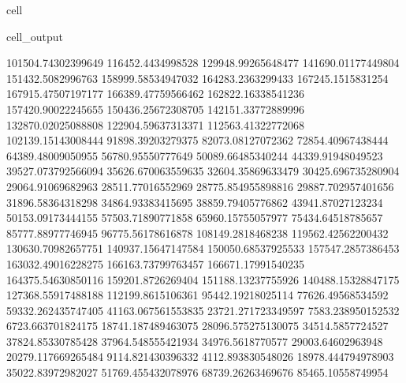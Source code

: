 \documentclass[letterpaper,10pt,english]{jupyterBook}
\begin{document}
\begin{sphinxuseclass}{cell}
\begin{sphinxVerbatimOutput}
\begin{sphinxuseclass}{cell_output}
\begin{sphinxVerbatim}[commandchars=\\\{\}]
101504.74302399649  116452.4434998528  129948.99265648477  141690.01177449804  151432.5082996763  158999.58534947032  164283.2363299433  167245.1515831254  167915.47507197177  166389.47759566462  162822.16338541236  157420.90022245655  150436.25672308705  142151.33772889996  132870.02025088808  122904.59637313371  112563.41322772068  102139.15143008444  91898.39203279375  82073.08127072362  72854.40967438444  64389.48009050955  56780.95550777649  50089.66485340244  44339.91948049523  39527.073792566094  35626.670063559635  32604.35869633479  30425.696735280904  29064.91069682963  28511.77016552969  28775.854955898816  29887.702957401656  31896.58364318298  34864.93383415695  38859.79405776862  43941.87027123234  50153.09173444155  57503.71890771858  65960.15755057977  75434.64518785657  85777.88977746945  96775.56178616878  108149.2818468238  119562.42562200432  130630.70982657751  140937.15647147584  150050.68537925533  157547.2857386453  163032.49016228275  166163.73799763457  166671.17991540235  164375.54630850116  159201.8726269404  151188.13237755926  140488.15328847175  127368.55917488188  112199.8615106361  95442.19218025114  77626.49568534592  59332.262435747405  41163.067561553835  23721.271723349597  7583.238950152532  \PYGZhy{}6723.663701824175  \PYGZhy{}18741.187489463075  \PYGZhy{}28096.575275130075  \PYGZhy{}34514.5857724527  \PYGZhy{}37824.85330785428  \PYGZhy{}37964.548555421934  \PYGZhy{}34976.5618770577  \PYGZhy{}29003.64602963948  \PYGZhy{}20279.117669265484  \PYGZhy{}9114.821430396332  4112.893830548026  18978.444794978903  35022.83972982027  51769.455432078976  68739.26263469676  85465.10558749954  

\end{sphinxVerbatim}
\end{sphinxuseclass}
\end{sphinxVerbatimOutput}
\end{sphinxuseclass}
\end{document}
